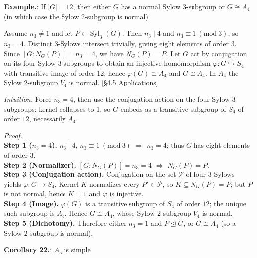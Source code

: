 \documentclass[12pt]{article}
\theoremstyle{definition}
\newcommand{\Syl}{\operatorname{Syl}}
\begin{document}
\newpage


\noindent\textbf{Example.}: If $|G|=12$, then either $G$ has a normal Sylow $3$-subgroup or $G\cong A_4$ (in which case the Sylow $2$-subgroup is normal)

\newpage

Assume $n_3\ne1$ and let $P\in\Syl_3(G)$. Then $n_3\mid4$ and $n_3\equiv1\ (\mathrm{mod}\ 3)$, so $n_3=4$. Distinct $3$-Sylows intersect trivially, giving eight elements of order $3$. Since $[G:N_G(P)]=n_3=4$, we have $N_G(P)=P$. Let $G$ act by conjugation on its four Sylow $3$-subgroups to obtain an injective homomorphism $\varphi:G\hookrightarrow S_4$ with transitive image of order $12$; hence $\varphi(G)\cong A_4$ and $G\cong A_4$. In $A_4$ the Sylow $2$-subgroup $V_4$ is normal. \hfill {\footnotesize [§4.5 Applications]}\\

\dotfill

\emph{Intuition.} Force $n_3=4$, then use the conjugation action on the four Sylow $3$-subgroups: kernel collapses to $1$, so $G$ embeds as a transitive subgroup of $S_4$ of order $12$, necessarily $A_4$.

\dotfill

\emph{Proof.}\\
\textbf{Step 1 ($n_3=4$).} $n_3\mid 4$, $n_3\equiv1\ (\mathrm{mod}\ 3)$ $\Rightarrow$ $n_3=4$; thus $G$ has eight elements of order $3$.\\
\textbf{Step 2 (Normalizer).} $[G:N_G(P)]=n_3=4$ $\Rightarrow$ $N_G(P)=P$.\\
\textbf{Step 3 (Conjugation action).} Conjugation on the set $\mathcal{P}$ of four $3$-Sylows yields $\varphi:G\to S_4$. Kernel $K$ normalizes every $P'\in\mathcal{P}$, so $K\subseteq N_G(P)=P$; but $P$ is not normal, hence $K=1$ and $\varphi$ is injective.\\
\textbf{Step 4 (Image).} $\varphi(G)$ is a transitive subgroup of $S_4$ of order $12$; the unique such subgroup is $A_4$. Hence $G\cong A_4$, whose Sylow $2$-subgroup $V_4$ is normal.\\
\textbf{Step 5 (Dichotomy).} Therefore either $n_3=1$ and $P\trianglelefteq G$, or $G\cong A_4$ (so a Sylow $2$-subgroup is normal).\\

\newpage


\noindent\textbf{Corollary 22.}: $A_5$ is simple
\end{document}
